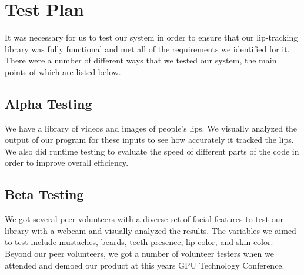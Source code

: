 \chapter{Test Plan}

It was necessary for us to test our system in order to ensure that our lip-tracking library was fully functional and met all of the requirements we identified for it. There were a number of different ways that we tested our system, the main points of which are listed below.

\section{Alpha Testing}

We have a library of videos and images of people's lips. We visually analyzed the output of our program for these inputs to see how accurately it tracked the lips. We also did runtime testing to evaluate the speed of different parts of the code in order to improve overall efficiency.

\section{Beta Testing}

We got several peer volunteers with a diverse set of facial features to test our library with a webcam and visually analyzed the results. The variables we aimed to test include mustaches, beards, teeth presence, lip color, and skin color. Beyond our peer volunteers, we got a number of volunteer testers when we attended and demoed our product at this years GPU Technology Conference.